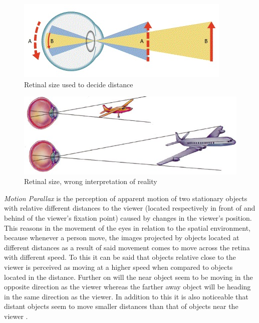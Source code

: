 \begin{figure}[h!]
   \centering
   \includegraphics[scale=1]{figures/cue6.jpg}
   \caption{Retinal size used to decide distance \cite{Perslides}}\label{fig:cue6}
\end{figure}

\begin{figure}[h!]
   \centering
   \includegraphics[scale=1]{figures/cue7.jpg}
   \caption{Retinal size, wrong interpretation of reality \cite{Psych}}\label{fig:cue7}
\end{figure}

\textit{Motion Parallax} is the perception of apparent motion of two stationary objects with relative different distances to the viewer (located respectively in front of and behind of the viewer’s fixation point) caused by changes in the viewer’s position. This reasons in the movement of the eyes in relation to the spatial environment, because whenever a person move, the images projected by objects located at different distances as a result of said movement comes to move across the retina with different speed. To this it can be said that objects relative close to the viewer is perceived as moving at a higher speed when compared to objects located in the distance. Further on will the near object seem to be moving in the opposite direction as the viewer whereas the farther away object will be heading in the same direction as the viewer.  In addition to this it is also noticeable that distant objects seem to move smaller distances than that of objects near the viewer \cite{Gale} \cite{Shrestha2013} \cite{Skybrary}.

